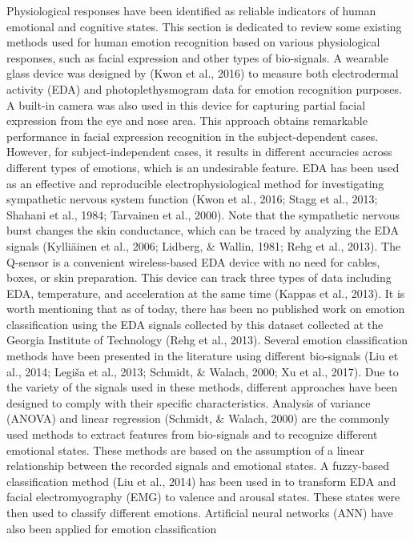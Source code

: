 Physiological responses have been identified as reliable indicators of human emotional 
and cognitive states. This section is dedicated to review some existing methods used for 
human emotion recognition based on various physiological responses, such as facial 
expression and other types of bio-signals.    
A wearable glass device was designed by (Kwon et al., 2016) to measure both electrodermal 
activity (EDA) and photoplethysmogram data for emotion recognition purposes. A built-in 
camera was also used in this device for capturing partial facial expression from the eye 
and nose area. This approach obtains remarkable performance in facial expression 
recognition in the subject-dependent cases. However, for subject-independent cases, 
it results in different accuracies across different types of emotions, which is an 
undesirable feature. 
EDA has been used as an effective and reproducible electrophysiological method for 
investigating sympathetic nervous system function (Kwon et al., 2016; Stagg et al., 
2013; Shahani et al., 1984; Tarvainen et al., 2000). Note that the sympathetic nervous 
burst changes the skin conductance, which can be traced by analyzing the EDA signals 
(Kylliäinen et al., 2006; Lidberg, \& Wallin, 1981; Rehg et al., 2013). The Q-sensor 
is a convenient wireless-based EDA device with no need for cables, boxes, or skin 
preparation. This device can track three types of data including EDA, temperature, 
and acceleration at the same time (Kappas et al., 2013). It is worth mentioning that 
as of today, there has been no published work on emotion classification using the 
EDA signals collected by this dataset collected at the Georgia Institute of 
Technology (Rehg et al., 2013).
Several emotion classification methods have been presented in the literature using 
different bio-signals (Liu et al., 2014; Legiša et al., 2013; Schmidt, \& Walach, 
2000; Xu et al., 2017). Due to the variety of the signals used in these methods, 
different approaches have been designed to comply with their specific characteristics. 
Analysis of variance (ANOVA) and linear regression (Schmidt, \& Walach, 2000) are the 
commonly used methods to extract features from bio-signals and to recognize different 
emotional states. These methods are based on the assumption of a linear relationship 
between the recorded signals and emotional states. A fuzzy-based classification 
method (Liu et al., 2014) has been used in to transform EDA and facial 
electromyography (EMG) to valence and arousal states. These states were then used 
to classify different emotions. 
Artificial neural networks (ANN) have also been applied for emotion classification 
